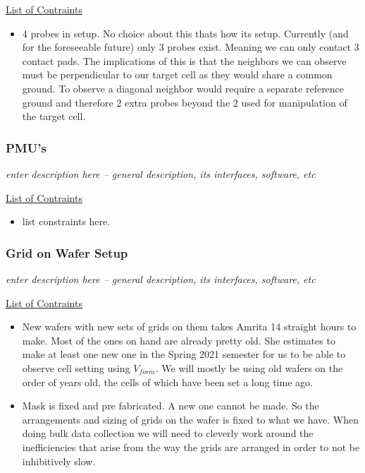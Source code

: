 \documentclass{article}
\begin{document}
          \underline{List of Contraints}
          \begin{itemize}
            \item 4 probes in setup. No choice about this thats how its setup. Currently (and for the foreseeable
            future) only 3 probes exist. Meaning we can only contact 3 contact pads. The implications of this is that
            the neighbors we can observe must be perpendicular to our target cell as they would share a common ground.
            To observe a diagonal neighbor would require a separate reference ground and therefore 2 extra probes beyond
            the 2 used for manipulation of the target cell.
          \end{itemize}

        \newpage
        \subsubsection{PMU's} 
          \textit{enter description here -- general description, its interfaces, software, etc}

          \underline{List of Contraints}
          \begin{itemize}
            \item list constraints here.
          \end{itemize}
        
        \newpage
        \subsubsection{Grid on Wafer Setup} 
          \textit{enter description here -- general description, its interfaces, software, etc}

          \underline{List of Contraints}
          \begin{itemize}
            \item New wafers with new sets of grids on them takes Amrita 14 straight hours to make. Most of the ones on
            hand are already pretty old. She estimates to make at least one new one in the Spring 2021 semester for us
            to be able to observe cell setting using $V_{form}$. We will mostly be using old wafers on the order of
            years old, the cells of which have been set a long time ago.
            \item Mask is fixed and pre fabricated. A new one cannot be made. So the arrangements and sizing of grids on
            the wafer is fixed to what we have. When doing bulk data collection we will need to cleverly work around the
            inefficiencies that arise from the way the grids are arranged in order to not be inhibitively slow.
          \end{itemize}
        
\end{document}
